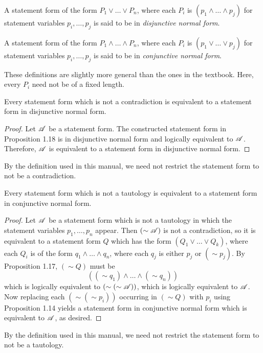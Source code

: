 A statement form of the form \(P_1 \lor \dots \lor P_n\), where each \(P_i\) is \((p_1 \land \dots \land p_j)\) for statement variables \(p_i, \dots, p_j\) is said to be in \textit{disjunctive normal form}.

A statement form of the form \(P_1 \land \dots \land P_n\), where each \(P_i\) is \((p_1 \lor \dots \lor p_j)\) for statement variables \(p_i, \dots, p_j\) is said to be in \textit{conjunctive normal form}.

\note{} These definitions are slightly more general than the ones in the textbook. Here, every \(P_i\) need not be of a fixed length.

\setcounter{definition}{19}
\begin{corollary}
  Every statement form which is not a contradiction is equivalent to a statement form in disjunctive normal form.

  \begin{proof}
    Let \(\mathscr{A}\) be a statement form. The constructed statement form in Proposition 1.18 is in disjunctive normal form and logically equivalent to \(\mathscr{A}\). Therefore, \(\mathscr{A}\) is equivalent to a statement form in disjunctive normal form.
  \end{proof}

  \note{} By the definition used in this manual, we need not restrict the statement form to not be a contradiction.
\end{corollary}

\begin{corollary}
  Every statement form which is not a tautology is equivalent to a statement form in conjunctive normal form.
  
  \begin{proof}
    Let \(\mathscr{A}\) be a statement form which is not a tautology in which the statement variables \(p_1, \dots, p_n\) appear. Then \((\sim\mathscr{A})\) is not a contradiction, so it is equivalent to a statement form \(Q\) which has the form \((Q_1 \lor \dots \lor Q_k)\), where each \(Q_i\) is of the form \(q_1 \land \dots \land q_n\), where each \(q_j\) is either \(p_j\) or \((\sim p_j)\). By Proposition 1.17, \((\sim Q)\) must be
    \[((\sim q_1) \land \dots \land (\sim q_n))\]
    which is logically equivalent to \((\sim(\sim \mathscr{A}))\), which is logically equivalent to \(\mathscr{A}\). Now replacing each \((\sim(\sim p_i))\) occurring in \((\sim Q)\) with \(p_i\) using Proposition 1.14 yields a statement form in conjunctive normal form which is equivalent to \(\mathscr{A}\), as desired.
  \end{proof}

  \note{} By the definition used in this manual, we need not restrict the statement form to not be a tautology.
\end{corollary}

